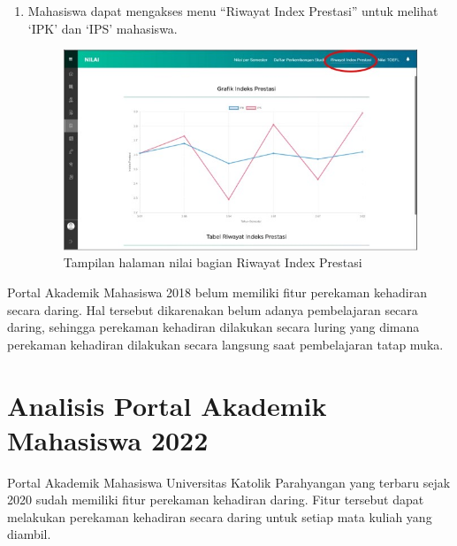 \begin{enumerate}
\begin{enumerate}
\begin{figure}[H]
			\label{fig:nilai_2018}
		\end{figure}
		\item Mahasiswa dapat mengakses menu ``Riwayat Index Prestasi'' untuk melihat `IPK' dan `IPS' mahasiswa.
		\begin{figure}[H]
			\centering
			\includegraphics[scale=0.7]{Gambar/rip2018.jpg}
			\caption{Tampilan halaman nilai bagian Riwayat Index Prestasi} 
			\label{fig:rip_2018}
		\end{figure}
	\end{enumerate}	
\end{enumerate}
Portal Akademik Mahasiswa 2018 belum memiliki fitur perekaman kehadiran secara daring. Hal tersebut dikarenakan belum adanya pembelajaran secara daring, sehingga perekaman kehadiran dilakukan secara luring yang dimana perekaman kehadiran dilakukan secara langsung saat pembelajaran tatap muka.

\section{Analisis Portal Akademik Mahasiswa 2022}
\label{sec:alur} 
Portal Akademik Mahasiswa Universitas Katolik Parahyangan yang terbaru sejak 2020 sudah memiliki fitur perekaman kehadiran daring. Fitur tersebut dapat melakukan perekaman kehadiran secara daring untuk setiap mata kuliah yang diambil. 

